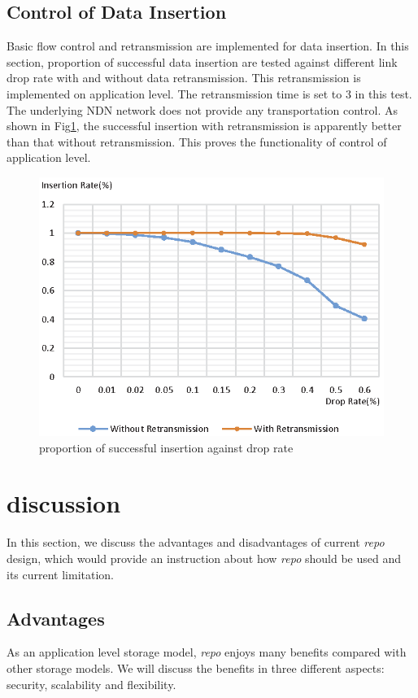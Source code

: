\documentclass[conference]{IEEEtran}
\begin{document}
\subsection{Control of Data Insertion}

Basic flow control and retransmission are implemented for data insertion. In this section, proportion of successful data insertion are tested against different link drop rate with and without data retransmission. This retransmission is implemented on application level. The retransmission time is set to 3 in this test. The underlying NDN network does not provide any transportation control. As shown in Fig\ref{drop-rate}, the successful insertion with retransmission is apparently better than that without retransmission. This proves the functionality of control of application level.

\begin{figure}[htbp]
\centering
\includegraphics{drop-rate.eps}
\caption{proportion of successful insertion against drop rate}
\label{drop-rate}
\end{figure}

\section{discussion} \label{section-discussion}

In this section, we discuss the advantages and disadvantages of current \emph{repo} design, which would provide an instruction about how \emph{repo} should be used and its current limitation.

\subsection{Advantages}
As an application level storage model, \emph{repo} enjoys many benefits compared with other storage models. We will discuss the benefits in three different aspects: security, scalability and flexibility.
\end{document}
